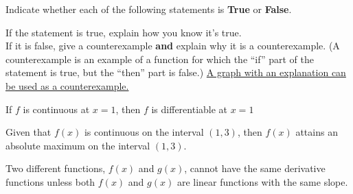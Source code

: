 \documentclass[handout]{ximera}
\begin{document}
\begin{problem}
Indicate whether each of the following statements is \textbf{True} or \textbf{False}.

If the statement is true, explain how you know it's true.\\



If it is false, give a counterexample \textbf{and} explain why it is a counterexample. (A counterexample is an example of a function for which the ``if'' part of the statement is true, but the ``then'' part is false.) \underline{A graph with an explanation can be used as a counterexample.}\\


\begin{question}
If $f$ is continuous at $x=1$, then $f$ is differentiable at $x=1$
    \begin{multipleChoice}
    \end{multipleChoice}
\end{question}


\begin{question}
	Given that $f(x)$ is continuous on the interval $(1,3)$, then $f(x)$ attains an absolute maximum on the interval $(1,3)$.\\
    
    \begin{multipleChoice}
    \end{multipleChoice}
\end{question}


\begin{question}
    Two different functions, $f(x)$ and $g(x)$, cannot have the same derivative functions unless both $f(x)$ and $g(x)$ are linear functions with the same slope.
    \begin{multipleChoice}
    \end{multipleChoice}
\end{question}

\end{problem}
\end{document}
